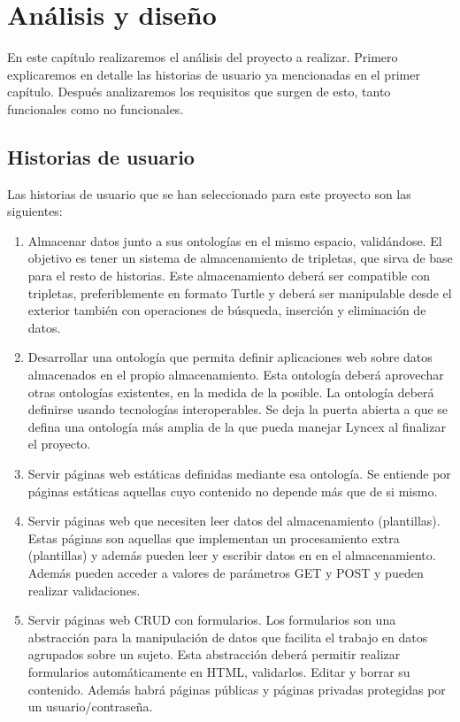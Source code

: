 \documentclass[12pt]{report} %
\begin{document}
\chapter{Análisis y diseño}

En este capítulo realizaremos el análisis del proyecto a realizar. Primero explicaremos en detalle las historias de usuario ya mencionadas en el primer capítulo. Después analizaremos los requisitos que surgen de esto, tanto funcionales como no funcionales.

\section{Historias de usuario}

Las historias de usuario que se han seleccionado para este proyecto son las siguientes:
\begin{enumerate}
    \item Almacenar datos junto a sus ontologías en el mismo espacio, validándose. El objetivo es tener un sistema de almacenamiento de tripletas, que sirva de base para el resto de historias. Este almacenamiento deberá ser compatible con tripletas, preferiblemente en formato Turtle y deberá ser manipulable desde el exterior también con operaciones de búsqueda, inserción y eliminación de datos.
    \item Desarrollar una ontología que permita definir aplicaciones web sobre datos almacenados en el propio almacenamiento. Esta ontología deberá aprovechar otras ontologías existentes, en la medida de la posible. La ontología deberá definirse usando tecnologías interoperables. Se deja la puerta abierta a que se defina una ontología más amplia de la que pueda manejar Lyncex al finalizar el proyecto.
    \item Servir páginas web estáticas definidas mediante esa ontología. Se entiende por páginas estáticas aquellas cuyo contenido no depende más que de si mismo.
    \item Servir páginas web que necesiten leer datos del almacenamiento (plantillas). Estas páginas son aquellas que implementan un procesamiento extra (plantillas) y además pueden leer y escribir datos en en el almacenamiento. Además pueden acceder a valores de parámetros GET y POST y pueden realizar validaciones.
    \item Servir páginas web CRUD con formularios. Los formularios son una abstracción para la manipulación de datos que facilita el trabajo en datos agrupados sobre un sujeto. Esta abstracción deberá permitir realizar formularios automáticamente en HTML, validarlos. Editar y borrar su contenido. Además habrá páginas públicas y páginas privadas protegidas por un usuario/contraseña.
\end{enumerate}
\end{document}
